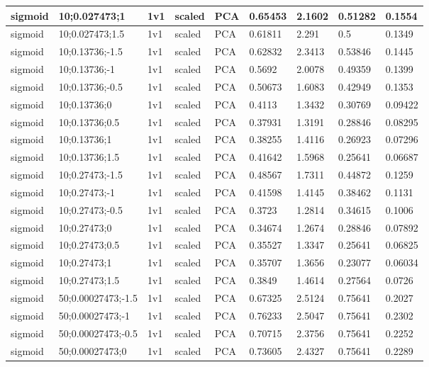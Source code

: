 \begin{longtable}{lllllllll}
sigmoid & 10;0.027473;1 & 1v1 & scaled & PCA & 0.65453 & 2.1602 & 0.51282 & 0.1554\\ \hline
sigmoid & 10;0.027473;1.5 & 1v1 & scaled & PCA & 0.61811 & 2.291 & 0.5 & 0.1349\\ \hline
sigmoid & 10;0.13736;-1.5 & 1v1 & scaled & PCA & 0.62832 & 2.3413 & 0.53846 & 0.1445\\ \hline
sigmoid & 10;0.13736;-1 & 1v1 & scaled & PCA & 0.5692 & 2.0078 & 0.49359 & 0.1399\\ \hline
sigmoid & 10;0.13736;-0.5 & 1v1 & scaled & PCA & 0.50673 & 1.6083 & 0.42949 & 0.1353\\ \hline
sigmoid & 10;0.13736;0 & 1v1 & scaled & PCA & 0.4113 & 1.3432 & 0.30769 & 0.09422\\ \hline
sigmoid & 10;0.13736;0.5 & 1v1 & scaled & PCA & 0.37931 & 1.3191 & 0.28846 & 0.08295\\ \hline
sigmoid & 10;0.13736;1 & 1v1 & scaled & PCA & 0.38255 & 1.4116 & 0.26923 & 0.07296\\ \hline
sigmoid & 10;0.13736;1.5 & 1v1 & scaled & PCA & 0.41642 & 1.5968 & 0.25641 & 0.06687\\ \hline
sigmoid & 10;0.27473;-1.5 & 1v1 & scaled & PCA & 0.48567 & 1.7311 & 0.44872 & 0.1259\\ \hline
sigmoid & 10;0.27473;-1 & 1v1 & scaled & PCA & 0.41598 & 1.4145 & 0.38462 & 0.1131\\ \hline
sigmoid & 10;0.27473;-0.5 & 1v1 & scaled & PCA & 0.3723 & 1.2814 & 0.34615 & 0.1006\\ \hline
sigmoid & 10;0.27473;0 & 1v1 & scaled & PCA & 0.34674 & 1.2674 & 0.28846 & 0.07892\\ \hline
sigmoid & 10;0.27473;0.5 & 1v1 & scaled & PCA & 0.35527 & 1.3347 & 0.25641 & 0.06825\\ \hline
sigmoid & 10;0.27473;1 & 1v1 & scaled & PCA & 0.35707 & 1.3656 & 0.23077 & 0.06034\\ \hline
sigmoid & 10;0.27473;1.5 & 1v1 & scaled & PCA & 0.3849 & 1.4614 & 0.27564 & 0.0726\\ \hline
sigmoid & 50;0.00027473;-1.5 & 1v1 & scaled & PCA & 0.67325 & 2.5124 & 0.75641 & 0.2027\\ \hline
sigmoid & 50;0.00027473;-1 & 1v1 & scaled & PCA & 0.76233 & 2.5047 & 0.75641 & 0.2302\\ \hline
sigmoid & 50;0.00027473;-0.5 & 1v1 & scaled & PCA & 0.70715 & 2.3756 & 0.75641 & 0.2252\\ \hline
sigmoid & 50;0.00027473;0 & 1v1 & scaled & PCA & 0.73605 & 2.4327 & 0.75641 & 0.2289\\ \hline

\end{longtable}
